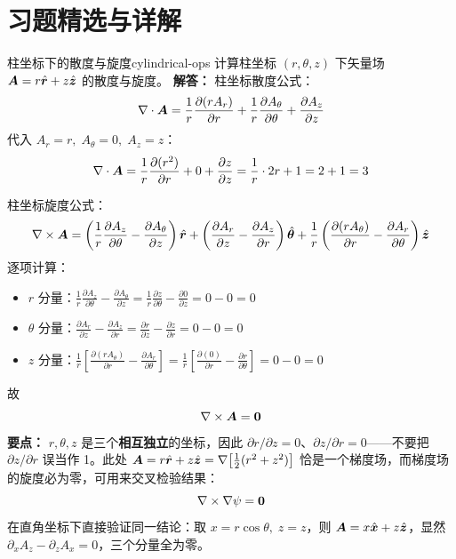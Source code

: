 ﻿%

\section*{习题精选与详解}

\begin{example}{柱坐标下的散度与旋度}{cylindrical-ops}
计算柱坐标 $(r,\theta,z)$ 下矢量场 $\bm{A} = r\hat{\bm{r}} + z\hat{\bm{z}}$ 的散度与旋度。
\tcblower
\textbf{解答：}
柱坐标散度公式：
\[
\nabla\cdot\bm{A} = \frac{1}{r}\frac{\partial(rA_r)}{\partial r} + \frac{1}{r}\frac{\partial A_\theta}{\partial\theta} + \frac{\partial A_z}{\partial z}
\]
代入 $A_r = r,\; A_\theta = 0,\; A_z = z$：
\[
\nabla\cdot\bm{A} = \frac{1}{r}\frac{\partial(r^2)}{\partial r} + 0 + \frac{\partial z}{\partial z} = \frac{1}{r}\cdot 2r + 1 = 2 + 1 = 3
\]

柱坐标旋度公式：
\[
\nabla\times\bm{A} = \left(\frac{1}{r}\frac{\partial A_z}{\partial\theta} - \frac{\partial A_\theta}{\partial z}\right)\hat{\bm{r}} + \left(\frac{\partial A_r}{\partial z} - \frac{\partial A_z}{\partial r}\right)\hat{\bm{\theta}} + \frac{1}{r}\left(\frac{\partial(rA_\theta)}{\partial r} - \frac{\partial A_r}{\partial\theta}\right)\hat{\bm{z}}
\]
逐项计算：
\begin{itemize}[leftmargin=*,itemsep=0pt]
\item $r$ 分量：$\frac{1}{r}\frac{\partial A_z}{\partial\theta} - \frac{\partial A_\theta}{\partial z} = \frac{1}{r}\frac{\partial z}{\partial\theta} - \frac{\partial 0}{\partial z} = 0 - 0 = 0$
\item $\theta$ 分量：$\frac{\partial A_r}{\partial z} - \frac{\partial A_z}{\partial r} = \frac{\partial r}{\partial z} - \frac{\partial z}{\partial r} = 0 - 0 = 0$
\item $z$ 分量：$\frac{1}{r}\left[\frac{\partial(rA_\theta)}{\partial r} - \frac{\partial A_r}{\partial\theta}\right] = \frac{1}{r}\left[\frac{\partial(0)}{\partial r} - \frac{\partial r}{\partial\theta}\right] = 0 - 0 = 0$
\end{itemize}
故
\[
\nabla\times\bm{A} = \bm{0}
\]
\textbf{要点：} $r,\theta,z$ 是三个\textbf{相互独立}的坐标，因此 $\partial r/\partial z = 0$、$\partial z/\partial r = 0$——不要把 $\partial z/\partial r$ 误当作 1。此处 $\bm{A}=r\hat{\bm{r}}+z\hat{\bm{z}}=\nabla\!\left[\frac{1}{2}(r^2+z^2)\right]$ 恰是一个梯度场，而梯度场的旋度必为零，可用来交叉检验结果：
\[
\nabla\times\nabla\psi = \bm{0}
\]
在直角坐标下直接验证同一结论：取 $x=r\cos\theta,\;z=z$，则 $\bm{A}=x\hat{\bm{x}}+z\hat{\bm{z}}$，显然 $\partial_x A_z-\partial_z A_x=0$，三个分量全为零。
\end{example}

